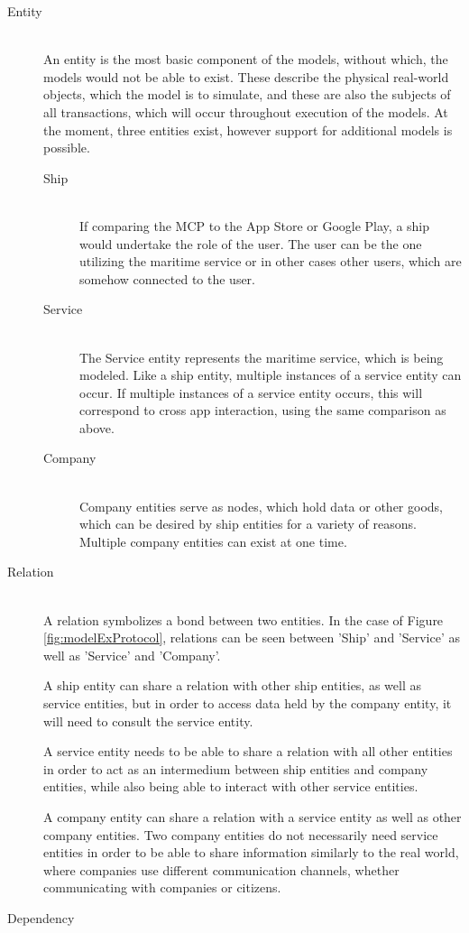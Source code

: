 \begin{description}
	\item[Entity]\ \\
	An entity is the most basic component of the models, without which, the models would not be able to exist. These describe the physical real-world objects, which the model is to simulate, and these are also the subjects of all transactions, which will occur throughout execution of the models. At the moment, three entities exist, however support for additional models is possible.
	\begin{description}
		\item[Ship]\ \\
		If comparing the MCP to the App Store or Google Play, a ship would undertake the role of the user. The user can be the one utilizing the maritime service or in other cases other users, which are somehow connected to the user. 
		\item[Service]\ \\
		The Service entity represents the maritime service, which is being modeled. Like a ship entity, multiple instances of a service entity can occur. If multiple instances of a service entity occurs, this will correspond to cross app interaction, using the same comparison as above.
		\item[Company]\ \\
		Company entities serve as nodes, which hold data or other goods, which can be desired by ship entities for a variety of reasons. Multiple company entities can exist at one time. 
	\end{description}
	\item[Relation]\ \\
	A relation symbolizes a bond between two entities. In the case of Figure \ref{fig:modelExProtocol}, relations can be seen between 'Ship' and 'Service' as well as 'Service' and 'Company'.

	A ship entity can share a relation with other ship entities, as well as service entities, but in order to access data held by the company entity, it will need to consult the service entity.

	A service entity needs to be able to share a relation with all other entities in order to act as an intermedium between ship entities and company entities, while also being able to interact with other service entities.

	A company entity can share a relation with a service entity as well as other company entities. Two company entities do not necessarily need service entities in order to be able to share information similarly to the real world, where companies use different communication channels, whether communicating with companies or citizens.
	\item[Dependency]\ \\
\end{description}

